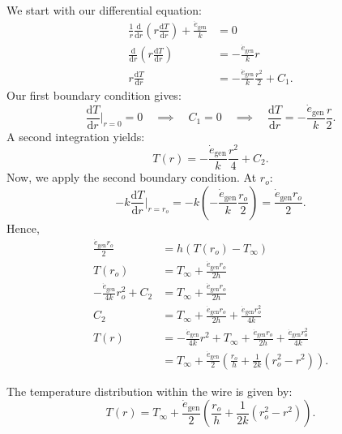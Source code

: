 \begin{derivation}
  \derivationpart
  We start with our differential equation:
  \begin{align*}
    \frac{1}{r} \frac{\mathrm{d}}{\mathrm{d}r} \left( r \frac{\mathrm{d}T}{\mathrm{d}r} \right) + \frac{\dot{e}_{\text{gen}}}{k} &= 0 \\
    \frac{\mathrm{d}}{\mathrm{d}r} \left( r \frac{\mathrm{d}T}{\mathrm{d}r} \right) &= - \frac{\dot{e}_{\text{gen}}}{k}r \\
    r \frac{\mathrm{d}T}{\mathrm{d}r} &= - \frac{\dot{e}_{\text{gen}}}{k} \frac{r^2}{2} + C_1
  .\end{align*}
  Our first boundary condition gives:
  \begin{equation*}
    \frac{\mathrm{d}T}{\mathrm{d}r} \bigg|_{r = 0} = 0 \quad \implies \quad C_1 = 0 \quad \implies \quad \frac{\mathrm{d}T}{\mathrm{d}r} = - \frac{\dot{e}_{\text{gen}}}{k} \frac{r}{2}
  .\end{equation*}
  A second integration yields:
  \begin{equation*}
    T(r) = - \frac{\dot{e}_{\text{gen}}}{k} \frac{r^2}{4} + C_2
  .\end{equation*}
  Now, we apply the second boundary condition.
  At $r_o$:
  \begin{equation*}
    -k \frac{\mathrm{d}T}{\mathrm{d}r} \bigg|_{r = r_o} = -k \left( - \frac{\dot{e}_{\text{gen}}}{k} \frac{r_o}{2} \right) = \frac{\dot{e}_{\text{gen}}r_o}{2}
  .\end{equation*}
  Hence,
  \begin{align*}
    \frac{\dot{e}_{\text{gen}}r_o}{2} &= h \left( T(r_o) - T_{\infty} \right) \\
    T(r_o) &= T_{\infty} + \frac{\dot{e}_{\text{gen}} r_o}{2h} \\
    - \frac{\dot{e}_{\text{gen}}}{4k} r_o^2 + C_2 &= T_{\infty} + \frac{\dot{e}_{\text{gen}} r_o}{2h} \\
    C_2 &= T_{\infty} + \frac{\dot{e}_{\text{gen}} r_o}{2h} + \frac{\dot{e}_{\text{gen}} r_o^2}{4k} \\
    T(r) &= - \frac{\dot{e}_{\text{gen}}}{4k} r^2 + T_{\infty} + \frac{\dot{e}_{\text{gen}} r_o}{2h} + \frac{\dot{e}_{\text{gen}} r_o^2}{4k} \\
         &= T_{\infty} + \frac{\dot{e}_{\text{gen}}}{2} \left( \frac{r_o}{h} + \frac{1}{2k} \left( r_o^2 - r^2 \right) \right)
  .\end{align*}
  
  \begin{subresult}
    The temperature distribution within the wire is given by:
    \begin{equation*}
      T(r) = T_{\infty} + \frac{\dot{e}_{\text{gen}}}{2} \left( \frac{r_o}{h} + \frac{1}{2k} \left( r_o^2 - r^2 \right) \right)
    .\end{equation*}
  \end{subresult}
  

\end{derivation}
